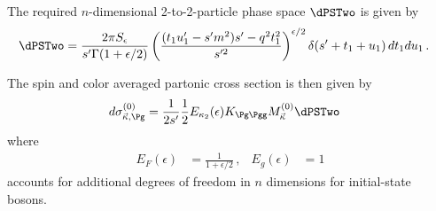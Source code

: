 The required $n$-dimensional 2-to-2-particle phase space $\dPSTwo$ is given by
\begin{align}
\dPSTwo &= \frac {2\pi S_\epsilon}{s'\Gamma(1+\epsilon/2)}\left(\frac{(t_1u_1'-s'm^2)s' - q^2t_1^2}{s'^2}\right)^{\epsilon/2}\delta(s'+t_1+u_1)\,dt_1du_1 \label{eq:dps2}\,.
\end{align}

The spin and color averaged partonic cross section is then given by
\begin{align}
d\sigma_{\vec \kappa,\Pg}^{(0)} &= \frac 1 {2s'}\frac 1 2 E_{\kappa_2}(\epsilon)K_{\Pg\Pgg} M_{\vec \kappa}^{(0)} \dPSTwo
\end{align}
where
\begin{align}
E_{F}(\epsilon) &= \frac{1}{1+\epsilon/2}\,, & E_{g}(\epsilon) &= 1
\end{align}
accounts for additional degrees of freedom in $n$ dimensions for initial-state bosons.
